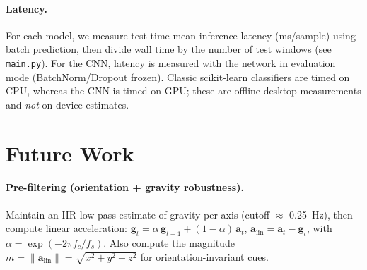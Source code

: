 \documentclass[10pt,twocolumn]{article}
\begin{document}
\begin{table}[H]
\centering
\scriptsize
{}
\caption{5-fold CV performance using raw features (5\,s windows, 1\,s stride). Metrics are mean $\pm$ std across folds (in \%), inference time reported as mean $\pm$ std (ms/sample).}
\label{tab:raw}
\end{table}

\paragraph{Latency.} For each model, we measure test-time mean inference latency (ms/sample) using batch prediction, then divide wall time by the number of test windows (see \texttt{main.py}). For the CNN, latency is measured with the network in evaluation mode (BatchNorm/Dropout frozen). Classic scikit-learn classifiers are timed on CPU, whereas the CNN is timed on GPU; these are offline desktop measurements and \emph{not} on-device estimates.

\section{Future Work}
\label{sec:future}
\paragraph{Pre-filtering (orientation + gravity robustness).}
Maintain an IIR low-pass estimate of gravity per axis (cutoff $\approx$ 0.25\, Hz), then compute linear acceleration: $\mathbf{g}_t = \alpha\,\mathbf{g}_{t-1} + (1-\alpha)\,\mathbf{a}_t$, $\mathbf{a}_{\text{lin}} = \mathbf{a}_t - \mathbf{g}_t$, with $\alpha = \exp(-2\pi f_c / f_s)$. Also compute the magnitude $m=\lVert\mathbf{a}_{\text{lin}}\rVert=\sqrt{x^2+y^2+z^2}$ for orientation-invariant cues.
\end{document}
